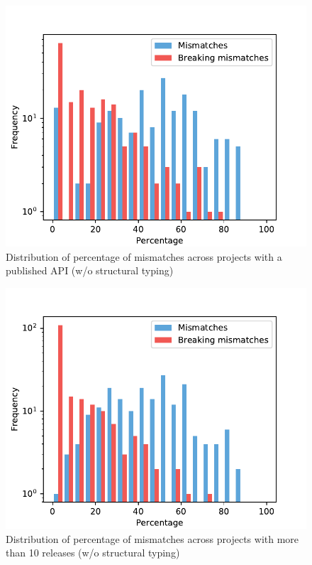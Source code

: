 \documentclass{l4proj}
\begin{document}
\begin{appendices}
\begin{figure}[]
\centering
\caption{Distribution of percentage of mismatches across projects with
a published API (w/o structural typing)}
\label{DistributionPublishedAPI}
\includegraphics[height=0.4\textheight]{images/evaluation/distribution_mismatches_major_version_1}
\end{figure}

\begin{figure}[]
\centering
\caption{Distribution of percentage of mismatches across projects with
more than 10 releases (w/o structural typing)}
\label{DistributionTenReleases}
\includegraphics[height=0.4\textheight]{images/evaluation/distribution_mismatches_more_than_10}
\end{figure}


\end{appendices}
\end{document}
